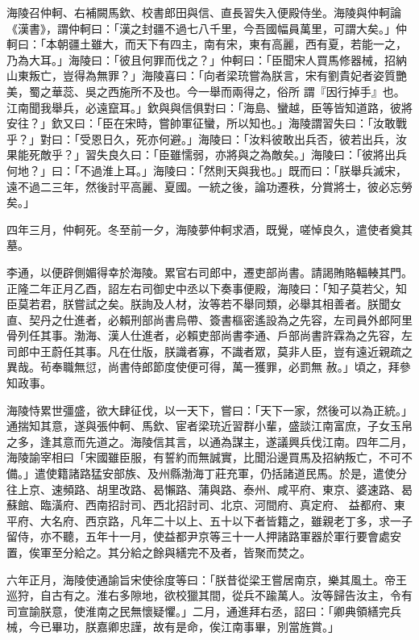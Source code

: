 \begin{pinyinscope}
 海陵召仲軻、右補闕馬欽、校書郎田與信、直長習失入便殿侍坐。海陵與仲軻論《漢書》，謂仲軻曰：「漢之封疆不過七八千里，今吾國幅員萬里，可謂大矣。」仲軻曰：「本朝疆土雖大，而天下有四主，南有宋，東有高麗，西有夏，若能一之，乃為大耳。」海陵曰：「彼且何罪而伐之？」仲軻曰：「臣聞宋人買馬修器械，招納山東叛亡，豈得為無罪？」海陵喜曰：「向者梁珫嘗為朕言，宋有劉貴妃者姿質艷美，蜀之華蕊、吳之西施所不及也。今一舉而兩得之，俗所
 謂『因行掉手』也。江南聞我舉兵，必遠竄耳。」欽與與信俱對曰：「海島、蠻越，臣等皆知道路，彼將安往？」欽又曰：「臣在宋時，嘗帥軍征蠻，所以知也。」海陵謂習失曰：「汝敢戰乎？」對曰：「受恩日久，死亦何避。」海陵曰：「汝料彼敢出兵否，彼若出兵，汝果能死敵乎？」習失良久曰：「臣雖懦弱，亦將與之為敵矣。」海陵曰：「彼將出兵何地？」曰：「不過淮上耳。」海陵曰：「然則天與我也。」既而曰：「朕舉兵滅宋，遠不過二三年，然後討平高麗、夏國。一統之後，論功遷秩，分賞將士，彼必忘勞矣。」



 四年三月，仲軻死。冬至前一夕，海陵夢仲軻求酒，既覺，嗟悼良久，遣使者奠其墓。



 李通，以便辟側媚得幸於海陵。累官右司郎中，遷吏部尚書。請謁賄賂輻輳其門。正隆二年正月乙酉，詔左右司御史中丞以下奏事便殿，海陵曰：「知子莫若父，知臣莫若君，朕嘗試之矣。朕詢及人材，汝等若不舉同類，必舉其相善者。朕聞女直、契丹之仕進者，必賴刑部尚書烏帶、簽書樞密遙設為之先容，左司員外郎阿里骨列任其事。渤海、漢人仕進者，必賴吏部尚書李通、戶部尚書許霖為之先容，左司郎中王蔚任其事。凡在仕版，朕識者寡，不識者眾，莫非人臣，豈有遠近親疏之異哉。茍奉職無愆，尚書侍郎節度使便可得，萬一獲罪，必罰無
 赦。」頃之，拜參知政事。



 海陵恃累世彊盛，欲大肆征伐，以一天下，嘗曰：「天下一家，然後可以為正統。」通揣知其意，遂與張仲軻、馬欽、宦者梁珫近習群小輩，盛談江南富庶，子女玉帛之多，逢其意而先道之。海陵信其言，以通為謀主，遂議興兵伐江南。四年二月，海陵諭宰相曰「宋國雖臣服，有誓約而無誠實，比聞沿邊買馬及招納叛亡，不可不備。」遣使籍諸路猛安部族、及州縣渤海丁莊充軍，仍括諸道民馬。於是，遣使分往上京、速頻路、胡里改路、曷懶路、蒲與路、泰州、咸平府、東京、婆速路、曷蘇館、臨潢府、西南招討司、西北招討司、北京、河間府、真定府、
 益都府、東平府、大名府、西京路，凡年二十以上、五十以下者皆籍之，雖親老丁多，求一子留侍，亦不聽，五年十一月，使益都尹京等三十一人押諸路軍器於軍行要會處安置，俟軍至分給之。其分給之餘與繕完不及者，皆聚而焚之。



 六年正月，海陵使通諭旨宋使徐度等曰：「朕昔從梁王嘗居南京，樂其風土。帝王巡狩，自古有之。淮右多隙地，欲校獵其間，從兵不踰萬人。汝等歸告汝主，令有司宣諭朕意，使淮南之民無懷疑懼。」二月，通進拜右丞，詔曰：「卿典領繕完兵械，今已畢功，朕嘉卿忠謹，故有是命，俟江南事畢，別當旌賞。」




\end{pinyinscope}
